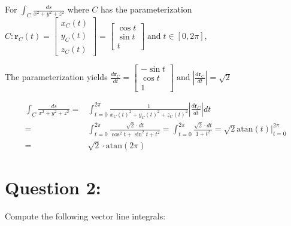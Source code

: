 \documentclass{article}
\newcommand{\abs}[1]{\left|#1\right|}
\newcommand{\atan}{\text{atan}}
\newcommand{\at}[1]{\left. #1 \right|}
\newcommand{\dr}[1]{\textcolor{dark_red}{#1}}
\begin{document}
\pagebreak

\begin{framed}
\dr{For \(\int_C \frac{ds}{x^2 + y^2 + z^2}\) where \(C\) has the parameterization \(C: \mathbf{r}_C(t) = \begin{bmatrix} x_C(t) \\ y_C(t) \\ z_C(t) \end{bmatrix} = \begin{bmatrix} \cos t \\ \sin t \\ t \end{bmatrix} \;\text{and}\; t \in [0,2\pi]\),}

\dr{The parameterization yields \(\frac{d\mathbf{r}_C}{dt} = \begin{bmatrix} -\sin t \\ \cos t \\ 1 \end{bmatrix} \;\text{and}\; \abs{\frac{d\mathbf{r}_C}{dt}} = \sqrt{2}\)}

\dr{\begin{align*}
\int_C \frac{ds}{x^2 + y^2 + z^2} = & \int_{t=0}^{2\pi} \frac{1}{x_C(t)^2 + y_C(t)^2 + z_C(t)^2}\abs{\frac{d\mathbf{r}_C}{dt}}dt \\
= & \int_{t=0}^{2\pi} \frac{\sqrt{2} \cdot dt}{\cos^2 t + \sin^2 t + t^2} 
= \int_{t=0}^{2\pi} \frac{\sqrt{2} \cdot dt}{1 + t^2} 
= \sqrt{2}\at{\atan(t)}_{t = 0}^{2\pi} \\
= & \sqrt{2} \cdot \atan(2\pi)
\end{align*}}
\end{framed}





\section*{Question 2:}

Compute the following vector line integrals:
\end{document}
